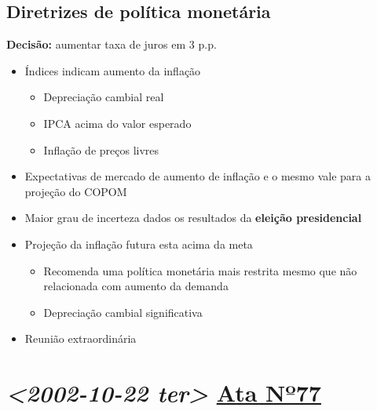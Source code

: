 \documentclass[11pt]{article}
\begin{document}
\subsection*{Diretrizes de política monetária}
\label{sec:org24d198d}
\textbf{Decisão:} aumentar taxa de juros em 3 p.p.
\begin{itemize}
\item Índices indicam aumento da inflação
\begin{itemize}
\item Depreciação cambial real
\item IPCA acima do valor esperado
\item Inflação de preços livres
\end{itemize}
\item Expectativas de mercado de aumento de inflação e o mesmo vale para a projeção do COPOM
\item Maior grau de incerteza dados os resultados da \textbf{eleição presidencial}
\item Projeção da inflação futura esta acima da meta
\begin{itemize}
\item Recomenda uma política monetária mais restrita mesmo que não relacionada com aumento da demanda
\item Depreciação cambial significativa
\end{itemize}
\item Reunião extraordinária
\end{itemize}

\section*{\textit{<2002-10-22 ter> } \href{https://www.bcb.gov.br/publicacoes/atascopom/22102002}{Ata Nº77}}
\label{sec:org866ccd2}
\end{document}

